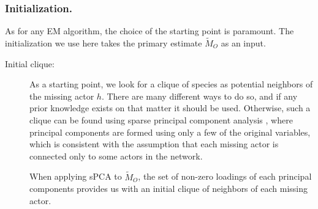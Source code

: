 \subsubsection*{Initialization.}
\label{init}
As for any EM algorithm, the choice of the starting point is paramount. The initialization we use here takes the primary estimate $\widetilde{M}_O$ as an input.
\begin{description}
\item [Initial clique:]
As a starting point, we look for a clique of species as potential neighbors of the missing actor $h$. There are many different ways to do so, and if any prior knowledge exists on that matter it should be used. Otherwise, such a clique can be found using sparse principal component analysis \citep[sPCA;][]{spca}, where principal components are formed using only a few of the original variables, which is consistent with the assumption that each missing actor is connected only to some actors in the network. 

When applying sPCA to $\widetilde{M}_O$, the set of non-zero loadings of each principal components provides us with an initial clique of neighbors of each missing actor.


\end{description}
